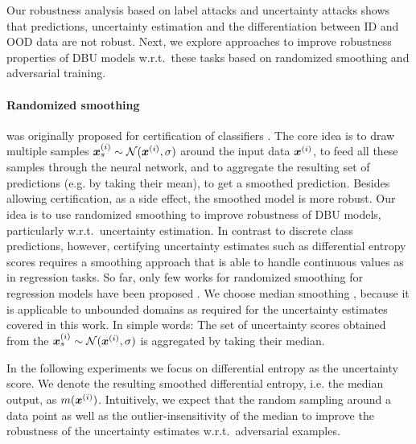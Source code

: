 Our robustness analysis based on label attacks and uncertainty attacks shows that predictions, uncertainty estimation and the differentiation between ID and OOD data are not robust. Next, we explore approaches to improve robustness properties of DBU models w.r.t.\ these tasks based on randomized smoothing and adversarial training. 

\paragraph{Randomized smoothing} was originally proposed for certification of classifiers \cite{cohen2019}.
The core idea is to draw multiple samples ${\bm{x}}^{(i)}_s \sim \operatorname{\mathcal{N}}({\bm{x}}^{(i)}, \sigma)$ around the input data ${\bm{x}}^{(i)}$, to feed all these samples through the neural network, and to aggregate the resulting set of predictions (e.g. by taking their mean), to get a smoothed prediction. Besides allowing certification, as a side effect, the smoothed model is more robust. Our idea is to use randomized smoothing to improve robustness of DBU models, particularly w.r.t.\ uncertainty estimation. In contrast to discrete class predictions, however, certifying uncertainty estimates such as differential entropy scores requires a smoothing approach that is able to handle continuous values as in regression tasks. So far, only few works for randomized smoothing for regression models have been proposed \citep{confidence_certificate_rs,median_smoothing}. We choose median smoothing \citep{median_smoothing}, because it is applicable to unbounded domains as required for the uncertainty estimates covered in this work. In simple words: The set of uncertainty scores obtained from the ${\bm{x}}^{(i)}_s \sim \operatorname{\mathcal{N}}({\bm{x}}^{(i)}, \sigma)$ is aggregated by taking their median. 

In the following experiments we focus on differential entropy as the uncertainty score. We denote the resulting smoothed differential entropy, i.e. the median output, as $m({\bm{x}}^{(i)})$.
Intuitively, we expect that the random sampling around a data point as well as the outlier-insensitivity of the median to improve the robustness of the uncertainty estimates w.r.t.\ adversarial examples.

